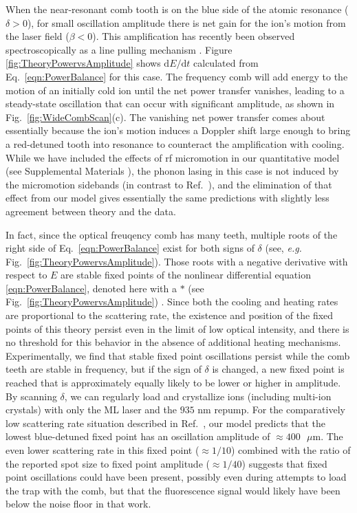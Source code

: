 \documentclass[preprint,superscriptaddress,amsmath,amssymb,aps,prl]{revtex4-1}
\begin{document}
When the near-resonant comb tooth is on the blue side of the atomic resonance ($\delta > 0$), for small oscillation amplitude there is net gain for the ion's motion from the laser field ($\beta<0$).  This amplification has recently been observed spectroscopically as a line pulling mechanism \cite{Ozawa2017single}.  Figure \ref{fig:TheoryPowervsAmplitude} shows $\mathrm{d}E/\mathrm{d}t$ calculated from Eq.~\ref{eqn:PowerBalance} for this case. The frequency comb will add energy to the motion of an initially cold ion until the net power transfer vanishes, leading to a steady-state oscillation that can occur with significant amplitude, as shown in Fig.~\ref{fig:WideCombScan}(c).  The vanishing net power transfer comes about essentially because the ion's motion induces a Doppler shift large enough to bring a red-detuned tooth into resonance to counteract the amplification with cooling.  While we have included the effects of rf micromotion in our quantitative model (see Supplemental Materials \cite{SupplementalMaterials}), the phonon lasing in this case is not induced by the micromotion sidebands (in contrast to Ref.~\cite{Xie2013pulsed}), and the elimination of that effect from our model gives essentially the same predictions with slightly less agreement between theory and the data. 

In fact, since the optical freuqency comb has many teeth, multiple roots of the right side of Eq.~\ref{eqn:PowerBalance} exist for both signs of $\delta$ (see, \textit{e.g.} Fig.~\ref{fig:TheoryPowervsAmplitude}). Those roots with a negative derivative with respect to $E$ are stable fixed points of the nonlinear differential equation \ref{eqn:PowerBalance}, denoted here with a $\ast$ (see Fig.~\ref{fig:TheoryPowervsAmplitude}) \cite{Strogatz}. Since both the cooling and heating rates are proportional to the scattering rate, the existence and position of the fixed points of this theory persist even in the limit of low optical intensity, and there is no threshold for this behavior in the absence of additional heating mechanisms. Experimentally, we find that stable fixed point oscillations persist while the comb teeth are stable in frequency, but if the sign of $\delta$ is changed, a new fixed point is reached that is approximately equally likely to be lower or higher in amplitude.  By scanning $\delta$, we can regularly load and crystallize ions (including multi-ion crystals) with only the ML laser and the $935\mbox{ nm}$ repump. For the comparatively low scattering rate situation described in Ref.~\cite{DavilaRodriguez2016doppler}, our model predicts that the lowest blue-detuned fixed point has an oscillation amplitude of $\approx 400 \mbox{ }\mu\mbox{m}$.  The even lower scattering rate in this fixed point ($\approx 1/10$) combined with the ratio of the reported spot size to fixed point amplitude ($\approx 1/40$) suggests that fixed point oscillations could have been present, possibly even during attempts to load the trap with the comb, but that the fluorescence signal would likely have been below the noise floor in that work.
\end{document}
